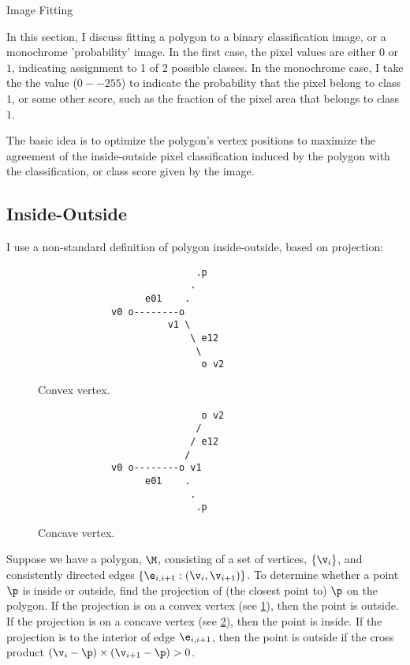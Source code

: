 \begin{plSection}{Image Fitting}
\label{sec:image-fitting}

In this section, I discuss fitting a polygon to a binary classification
image, or a monochrome 'probability' image.
In the first case, the pixel values are either $0$ or $1$,
indicating assignment to 1 of 2 possible classes.
In the monochrome case, I take the the value ($0--255$) to indicate
the probability that the pixel belong to class $1$,
or some other score, such as the fraction of the pixel area that belongs
to class $1$.

The basic idea is to optimize the polygon's vertex positions
to maximize the agreement of the inside-outside pixel classification
induced by the polygon with the classification, or class score
given by the image.

\subsection{Inside-Outside}
\label{sec:inside-outside}

I use a non-standard definition of polygon inside-outside,
based on projection:

\begin{figure}[!htp]
\centering
\begin{verbatim}
                            .p
                           .
                   e01    .
             v0 o--------o
                       v1 \
                           \ e12
                            \
                             o v2
\end{verbatim}
\caption{Convex vertex.
\label{fig:convex-vertex}}
\end{figure}

\begin{figure}[!htp]
\centering
\begin{verbatim}
                             o v2
                            /
                           / e12
                          /
             v0 o--------o v1
                   e01    .
                           .
                            .p
\end{verbatim}
\caption{Concave vertex.
\label{fig:concave-vertex}}
\end{figure}

Suppose we have a polygon, $\M$, consisting of a set of vertices,
$\{\v_i\}$, and consistently directed edges $\{\e_{i,i+1}:(\v_i,\v_{i+1})\}$.
To determine whether a point $\p$ is inside or outside,
find the projection of (the closest point to) $\p$ on the polygon.
If the projection is on a convex vertex (see \ref{fig:convex-vertex}),
then the point is outside.
If the projection is on a concave vertex (see \ref{fig:concave-vertex}),
then the point is inside.
If the projection is to the interior of edge $\e_{i,i+1}$,
then the point is outside if the cross product
$(\v_i-\p) \times (\v_{i+1}-\p) > 0$.


\end{plSection}
